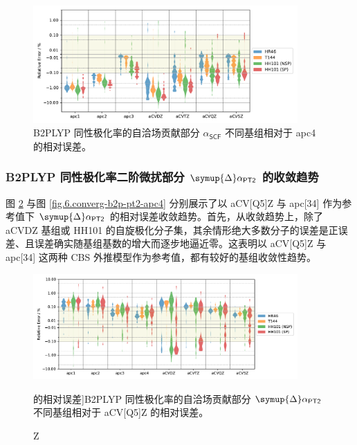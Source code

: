 \begin{figure}[!ht]
    \centering
    \includegraphics[width=0.9\textwidth]{assets/converg-b2p-scf-apc4.pdf}
    \caption[B2PLYP $\alpha_\textsf{SCF}$ 不同基组相对于 apc4 的相对误差]{B2PLYP 同性极化率的自洽场贡献部分 $\alpha_\textsf{SCF}$ 不同基组相对于 apc4 的相对误差。}
    \label{fig.6.converg-b2p-scf-apc4}
\end{figure}

\subsubsection{B2PLYP 同性极化率二阶微扰部分 $\symup{\Delta} \alpha_\textsf{PT2}$ 的收敛趋势}

图 \ref{fig.6.converg-b2p-pt2-aCV5Z} 与图 \ref{fig.6.converg-b2p-pt2-apc4} 分别展示了以 aCV[Q5]Z 与 apc[34] 作为参考值下 $\symup{\Delta} \alpha_\textsf{PT2}$ 的相对误差收敛趋势。首先，从收敛趋势上，除了 aCVDZ 基组或 HH101 的自旋极化分子集，其余情形绝大多数分子的误差是正误差、且误差确实随基组基数的增大而逐步地逼近零。这表明以 aCV[Q5]Z 与 apc[34] 这两种 CBS 外推模型作为参考值，都有较好的基组收敛性趋势。

\begin{figure}[!ht]
    \centering
    \includegraphics[width=0.9\textwidth]{assets/converg-b2p-pt2-aCV5Z.pdf}
    \caption[B2PLYP $\symup{\Delta} \alpha_\textsf{PT2}$ 不同基组相对于 aCV[Q5]Z 的相对误差]{B2PLYP 同性极化率的自洽场贡献部分 $\symup{\Delta} \alpha_\textsf{PT2}$ 不同基组相对于 aCV[Q5]Z 的相对误差。}
    \label{fig.6.converg-b2p-pt2-aCV5Z}
\end{figure}

